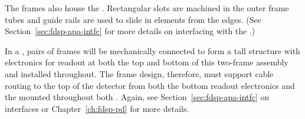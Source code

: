 
The  frames also house the .  %
Rectangular slots are machined in the outer frame tubes and guide rails are used to slide in  elements from the edges. %
(See Section~\ref{sec:fdsp-apa-intfc} for more details on interfacing with the .)   

In a  , pairs of  frames will be mechanically connected to form a \tpcheight %
tall structure with electronics for  readout at both the top and bottom of this two-frame assembly and  installed throughout.  The  frame design, therefore, must support cable routing to the top of the detector from both the bottom  readout electronics and the  mounted throughout both .  %
Again, see Section~\ref{sec:fdsp-apa-intfc} on interfaces or Chapter~\ref{ch:fdsp-pd} for more details.



